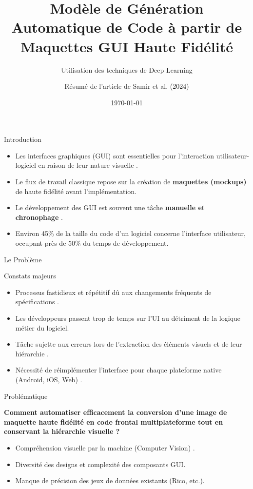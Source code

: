 \documentclass{beamer}
\title[Génération Automatique de Code GUI]{Modèle de Génération Automatique de Code à partir de Maquettes GUI Haute Fidélité}
\subtitle{Utilisation des techniques de Deep Learning}
\author{Résumé de l'article de Samir et al. (2024)}
\date{\today}
\begin{document}
\begin{frame}
    \titlepage
\end{frame}

\begin{frame}{Introduction}
    \begin{itemize}
        \item Les interfaces graphiques (GUI) sont essentielles pour l'interaction utilisateur-logiciel en raison de leur nature visuelle .
        \item Le flux de travail classique repose sur la création de \textbf{maquettes (mockups)} de haute fidélité avant l'implémentation.
        \item Le développement des GUI est souvent une tâche \textbf{manuelle et chronophage} .
        \item Environ 45\% de la taille du code d'un logiciel concerne l'interface utilisateur, occupant près de 50\% du temps de développement.
    \end{itemize}
\end{frame}

\begin{frame}{Le Problème}
    \begin{block}{Constats majeurs}
        \begin{itemize}
            \item Processus fastidieux et répétitif dû aux changements fréquents de spécifications .
            \item Les développeurs passent trop de temps sur l'UI au détriment de la logique métier du logiciel.
            \item Tâche sujette aux erreurs lors de l'extraction des éléments visuels et de leur hiérarchie .
            \item Nécessité de réimplémenter l'interface pour chaque plateforme native (Android, iOS, Web) .
        \end{itemize}
    \end{block}
\end{frame}

\begin{frame}{Problématique}
    \begin{center}
        \Large \textbf{Comment automatiser efficacement la conversion d'une image de maquette haute fidélité en code frontal multiplateforme tout en conservant la hiérarchie visuelle ?}
    \end{center}
    \vspace{0.5cm}
    \begin{itemize}
        \item Compréhension visuelle par la machine (Computer Vision) .
        \item Diversité des designs et complexité des composants GUI.
        \item Manque de précision des jeux de données existants (Rico, etc.).
    \end{itemize}
\end{frame}
\end{document}
